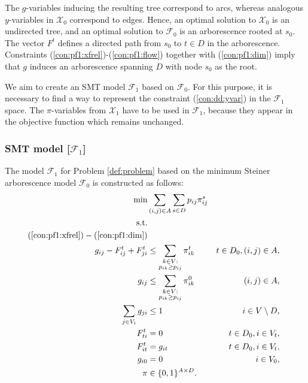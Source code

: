 The $g$-variables inducing the resulting tree correspond to arcs, whereas analogous $y$-variables in $\mathcal{X}_0$ correspond to edges.
Hence, an optimal solution to $\mathcal{X}_0$ is an undirected tree, and an optimal solution to $\mathcal{F}_0$ is an arborescence rooted at $s_0$.
The vector $F^t$ defines a directed path from $s_0$ to $t\in D$ in the arborescence.
Constraints (\ref{con:pf1:xfrel})-(\ref{con:pf1:flow}) together with (\ref{con:pf1:dim}) imply that $g$ induces an arborescence spanning $D$ with node $s_0$ as the root.

We aim to create an SMT model $\mathcal{F}_1$ based on $\mathcal{F}_0$.
For this purpose, it is necessary to find a way to represent the constraint (\ref{con:dd:yvar}) in the $\mathcal{F}_1$ space.
The $\pi$-variables from $\mathcal{X}_1$ have to be used in $\mathcal{F}_1$, because they appear in the objective function which remains unchanged.

\subsubsection{SMT model [$\mathcal{F}_1$]}

The model $\mathcal{F}_1$ for Problem \ref{def:problem} based on the minimum Steiner arborescence model $\mathcal{F}_0$ is constructed as follows: 
\begin{subequations}[resume]
\begin{align}
\notag\min & \sum\limits_{(i,j) \in A} \sum\limits_{s \in D} p_{ij} \pi^s_{ij}\\ 
\notag\text{s.t.} && \\
\notag(\ref{con:pf1:xfrel}) - (\ref{con:pf1:dim})\\
\label{con:pf1:yvar} g_{ij} - F^t_{ij}+F^t_{ji} & \leq \sum\limits_{\substack{k\in V: \\ p_{ik}\geq p_{ij}}}\pi^t_{ik}  & t\in D_0, (i,j)\in A,\\
\label{con:pf1:yvar0} g_{ij} & \leq \sum\limits_{\substack{k\in V: \\ p_{ik}\geq p_{ij}}}\pi^0_{ik}   &  (i,j)\in A,\\
\label{con:pf1:B}  \sum_{j\in V_i}g_{ji}&\leq 1 & i\in V\setminus D,\\
\label{con:pf1:noflowFromT} F_{ti}^t&=0 & t\in D_0, i\in V_t,\\
\label{con:pf1:fitt=xit} F_{it}^t&=g_{it} & t\in D_0, i\in V_t,\\
\label{con:pf1:xi0=0} g_{i0}&=0 & i\in V_0,\\
\label{con:pf1:dimy} \pi&\in \{0,1\}^{A\times D}.
\end{align}~
\end{subequations}

